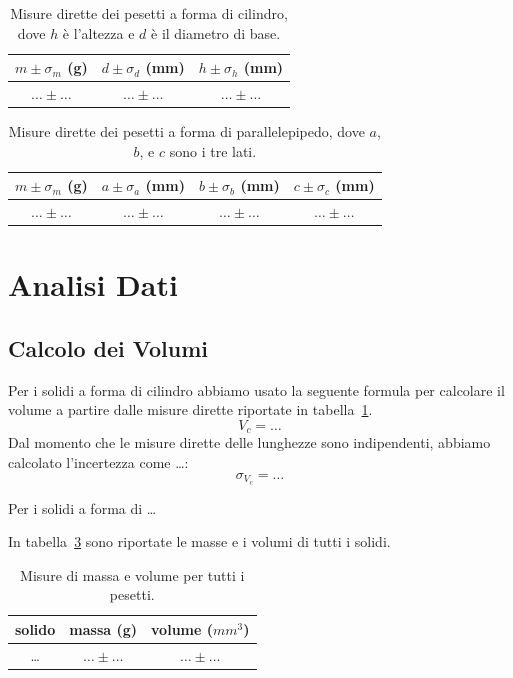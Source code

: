\documentclass[a4paper]{article}
\begin{document}
\begin{table}[]
    \centering
    \begin{tabular}{c|c|c}
      $m\pm \sigma_m$ (g)   & $d\pm\sigma_d$ (mm)  & $h\pm\sigma_h$ (mm)\\
      \hline
     $\ldots \pm \ldots$    & $\ldots \pm \ldots$ &$\ldots \pm \ldots$\\
    \end{tabular}
    \caption{Misure dirette dei pesetti a forma di cilindro, dove $h$ \`e l'altezza e $d$ \`e il diametro di base.}
    \label{tab:dir_cilindri}
\end{table}

\begin{table}[]
    \centering
    \begin{tabular}{c|c|c|c}
      $m\pm \sigma_m$ (g)   & $a\pm\sigma_a$ (mm)  & $b\pm\sigma_b$ (mm)& $c\pm\sigma_c$ (mm)\\
      \hline
       $\ldots \pm \ldots$  & $\ldots \pm \ldots$ & $\ldots \pm \ldots$ & $\ldots \pm \ldots$\\
    \end{tabular}
    \caption{Misure dirette dei pesetti a forma di parallelepipedo, dove $a$, $b$, e $c$ sono i tre lati.}
    \label{tab:dir_parallelepipedi}
\end{table}


\section{Analisi Dati}
\subsection{Calcolo dei Volumi}
Per i solidi a forma di cilindro abbiamo usato la seguente formula per calcolare il volume a partire dalle misure dirette riportate in tabella~\ref{tab:dir_cilindri}.
\begin{equation}
    V_c = \ldots
\end{equation}
Dal momento che le misure dirette delle lunghezze sono indipendenti, abbiamo calcolato l'incertezza come \ldots:
\begin{equation}
    \sigma_{V_c} = \ldots
\end{equation}

Per i solidi a forma di \ldots

In tabella~\ref{tab:m_V} sono riportate le masse e i volumi di tutti i solidi.

\begin{table}[]
    \centering
    \begin{tabular}{c|c|c}
      solido   & massa (g)  & volume ($mm^3$)\\
      \hline
       \ldots & $\ldots \pm \ldots$ & $\ldots \pm \ldots$\\
    \end{tabular}
    \caption{Misure di massa e volume per tutti i pesetti.}
    \label{tab:m_V}
\end{table}
\end{document}
